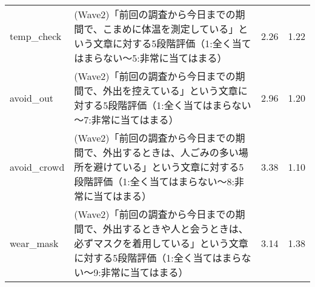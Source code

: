 \documentclass[
  11pt,
  a4paper,
]{article}
\begin{document}
\begin{table}[!h]
\begin{tabular}[t]{l>{\raggedright\arraybackslash}p{30em}cc}
temp\_check & (Wave2)「前回の調査から今日までの期間で、こまめに体温を測定している」という文章に対する5段階評価（1:全く当てはまらない～5:非常に当てはまる） & 2.26 & 1.22\\
avoid\_out & (Wave2)「前回の調査から今日までの期間で、外出を控えている」という文章に対する5段階評価（1:全く当てはまらない～7:非常に当てはまる） & 2.96 & 1.20\\
avoid\_crowd & (Wave2)「前回の調査から今日までの期間で、外出するときは、人ごみの多い場所を避けている」という文章に対する5段階評価（1:全く当てはまらない～8:非常に当てはまる） & 3.38 & 1.10\\
wear\_mask & (Wave2)「前回の調査から今日までの期間で、外出するときや人と会うときは、必ずマスクを着用している」という文章に対する5段階評価（1:全く当てはまらない～9:非常に当てはまる） & 3.14 & 1.38\\
\bottomrule
\end{tabular}
\end{table}
\end{document}
